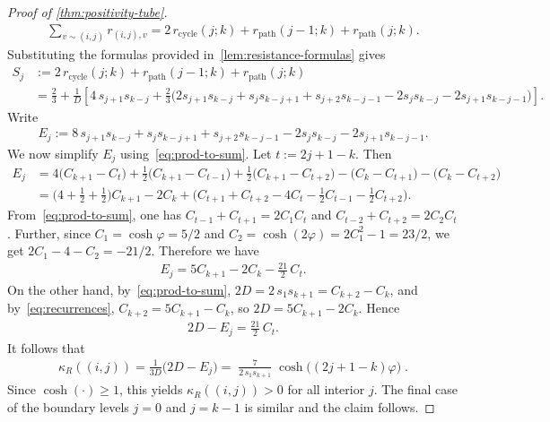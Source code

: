 \documentclass[11pt,a4paper]{amsart}
\newcommand{\resistance}[1]{\kappa_R\left({#1}\right)}
\begin{document}
\begin{proof}[Proof of \cref{thm:positivity-tube}]
\begin{align*}
            \sum_{v\sim (i,j)} r_{(i,j),v}
    =2\,r_{\mathrm{cycle}}(j;k)+r_{\mathrm{path}}(j-1;k)+r_{\mathrm{path}}(j;k).
        \end{align*}
    Substituting the formulas provided in~\cref{lem:resistance-formulas} gives
        {\footnotesize \begin{align*}
            S_j &:=2\,r_{\mathrm{cycle}}(j;k)+r_{\mathrm{path}}(j-1;k)+r_{\mathrm{path}}(j;k)\\
                &=\frac{2}{3}+
                \frac{1}{D}\left[
                4\,s_{j+1}s_{k-j}
                +\frac{2}{3}\Big(2 s_{j+1}s_{k-j}+s_j s_{k-j+1}+s_{j+2}s_{k-j-1}
                -2 s_j s_{k-j}-2 s_{j+1} s_{k-j-1}\Big)
                \right].
        \end{align*}}
    Write
        \begin{align*}
            E_j :=8\,s_{j+1}s_{k-j}+ s_j s_{k-j+1}+ s_{j+2}s_{k-j-1} -2 s_j s_{k-j}-2 s_{j+1} s_{k-j-1}.
        \end{align*}
    We now simplify $E_j$ using~\cref{eq:prod-to-sum}. Let $t:=2j+1-k$. Then
        \begin{align*}
            E_j&=4\big(C_{k+1}-C_{t}\big)
            +\tfrac12\big(C_{k+1}-C_{t-1}\big)
            +\tfrac12\big(C_{k+1}-C_{t+2}\big)
            -\big(C_k-C_{t+1}\big)
            -\big(C_k-C_{t+2}\big)\\
            &=\big(4+\tfrac12+\tfrac12\big)C_{k+1}-2C_k
            +\big(C_{t+1}+C_{t+2}-4C_t-\tfrac12 C_{t-1}-\tfrac12 C_{t+2}\big).
        \end{align*}
    From~\cref{eq:prod-to-sum}, one has $C_{t-1}+C_{t+1}=2C_1C_t$ and $C_{t-2}+C_{t+2}=2C_2C_t$. Further, since $C_1=\cosh\varphi=5/2$ and $C_2=\cosh(2\varphi)=2C_1^2-1=23/2$, we get $2C_1-4-C_2=-21/2$. Therefore we have
        \begin{align*}
            E_j = 5C_{k+1}-2C_k - \frac{21}{2}\,C_t.
        \end{align*}
    On the other hand, by~\cref{eq:prod-to-sum}, $2D=2\,s_1 s_{k+1}=C_{k+2}-C_k$, and by~\cref{eq:recurrences}, $C_{k+2}=5C_{k+1}-C_k$, so $2D=5C_{k+1}-2C_k$. Hence
        \begin{align*}
            2D-E_j=\frac{21}{2}\,C_t.
        \end{align*}
    It follows that
        \begin{align*}
            \resistance{(i,j)}
    =\frac{1}{3D}\big(2D-E_j\big)
    ={\;\frac{7}{2\,s_1 s_{k+1}}\;\cosh\big((2j+1-k)\varphi\big)\;}.
        \end{align*}
    Since $\cosh(\cdot)\ge 1$, this yields $\resistance{(i,j)}>0$ for all interior $j$. The final case of the boundary levels $j=0$ and $j=k-1$ is similar and the claim follows.
\end{proof}
\end{document}
